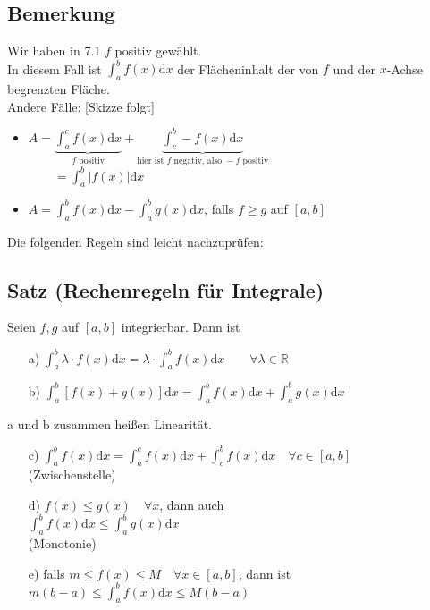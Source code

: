 \documentclass[12pt, titlepage]{article}
\newcommand{\R}{\mathds{R}}
\renewcommand{\>}{\rightarrow}
\renewcommand{\*}{\cdot}
\begin{document}
	\subsection{Bemerkung}
	Wir haben in 7.1 $f$ positiv gewählt.\\
	In diesem Fall ist $\int_{a}^{b}f(x)\textrm{d}x$ der Flächeninhalt der von $f$ und der $x$-Achse begrenzten Fläche.\\
	Andere Fälle: [Skizze folgt]
	\begin{itemize}
		\item $A=\underbrace{\int_{a}^{c}f(x)\textrm{d}x}_{f\textrm{ positiv}}+\underbrace{\int_{c}^{b}-f(x)\textrm{d}x}_{\textrm{hier ist }f\textrm{ negativ, also }-f\textrm{ positiv}}$\\
		$\qquad=\int_{a}^{b}|f(x)|\textrm{d}x$
		\item $A=\int_{a}^{b}f(x)\textrm{d}x-\int_{a}^{b}g(x)\textrm{d}x$, falls $f\geq g$ auf $[a,b]$
	\end{itemize}
	Die folgenden Regeln sind leicht nachzuprüfen:\subsection{Satz (Rechenregeln für Integrale)}
	Seien $f,g$ auf $[a,b]$ integrierbar. Dann ist
	\begin{itemize}
		\item[a)] $\int_{a}^{b}\lambda\*f(x)\textrm{d}x=\lambda\*\int_{a}^{b}f(x)\textrm{d}x\qquad\forall\lambda\in\R$
		\item[b)] $\int_{a}^{b}[f(x)+g(x)]\textrm{d}x=\int_{a}^{b}f(x)\textrm{d}x+\int_{a}^{b}g(x)\textrm{d}x$
	\end{itemize}
	a und b zusammen heißen Linearität.
	\begin{itemize}
		\item[c)] $\int_{a}^{b}f(x)\textrm{d}x=\int_{a}^{c}f(x)\textrm{d}x+\int_{c}^{b}f(x)\textrm{d}x\quad\forall c\in[a,b]$\\
		(Zwischenstelle)
		\item[d)] $f(x)\leq g(x)\quad\forall x$, dann auch\\
		$\int_{a}^{b}f(x)\textrm{d}x\leq\int_{a}^{b}g(x)\textrm{d}x$\\
		(Monotonie)
		\item[e)] falls $m\leq f(x)\leq M\quad\forall x\in[a,b]$, dann ist \\
		$m(b-a)\leq\int_{a}^{b}f(x)\textrm{d}x\leq M(b-a)$\\
	\end{itemize}
\end{document}
